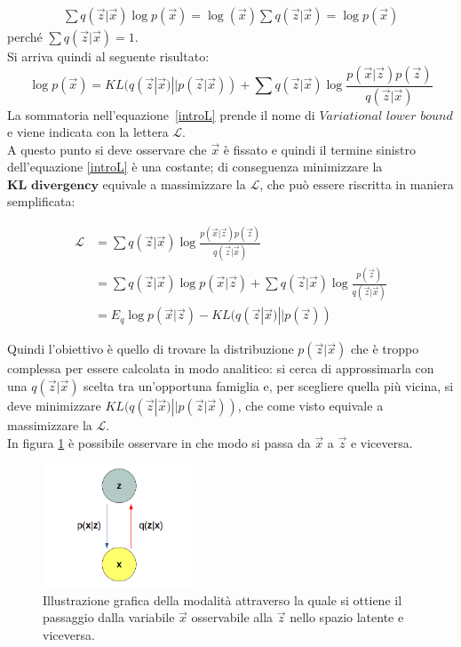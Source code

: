 \begin{align*}
	\sum q(\vec{z}|\vec{x})\log p(\vec{x}) =
	\log (\vec{x}) \sum q(\vec{z}|\vec{x}) =
	\log p(\vec{x})
\end{align*}
perché $\sum q(\vec{z}|\vec{x})=1$. \\
Si arriva quindi al seguente risultato:
\begin{equation}
	\log p(\vec{x}) = KL (q(\vec{z}|\vec{x}) || p(\vec{z}|\vec{x})) + \sum q(\vec{z}|\vec{x}) \log \frac{p(\vec{x}|\vec{z})p(\vec{z})}{q(\vec{z}|\vec{x})}
	\label{introL}
\end{equation}
La sommatoria nell'equazione~\ref{introL} prende il nome di $\textit{Variational lower bound}$ e viene indicata con la lettera $\mathcal{L}$. \\
A questo punto si deve osservare che $\vec{x}$ è fissato e quindi il termine sinistro dell'equazione \ref{introL} è una costante; di conseguenza minimizzare la $\textbf{KL divergency}$ equivale a massimizzare la $\mathcal{L}$, che può essere riscritta in maniera semplificata:

\begin{equation}
\label{eq:lower_bound}
\begin{split}
	\mathcal{L} &= \sum q(\vec{z}|\vec{x}) \log \frac{p(\vec{x}|\vec{z})p(\vec{z})}{q(\vec{z}|\vec{x})} \\
	 &=\sum q(\vec{z}|\vec{x}) \log p(\vec{x}|\vec{z}) + \sum q(\vec{z}|\vec{x}) \log \frac{p(\vec{z})}{q(\vec{z}|\vec{x})} \\
	  &= E_{q}\log p(\vec{x}|\vec{z}) - KL (q(\vec{z}|\vec{x}) || p(\vec{z}))
\end{split}
\end{equation}

Quindi l'obiettivo è quello di trovare la distribuzione $p(\vec{z}|\vec{x})$ che è troppo complessa per essere calcolata in modo analitico: si cerca di approssimarla con una $q(\vec{z}|\vec{x})$ scelta tra un'opportuna famiglia e, per scegliere quella più vicina, si deve minimizzare $KL (q(\vec{z}|\vec{x}) || p(\vec{z}|\vec{x}))$, che come visto equivale a massimizzare la $\mathcal{L}$. \\
In figura \ref{grafo} è possibile osservare in che modo si passa da $\vec{x}$ a $\vec{z}$ e viceversa.

\newpage

\begin{figure}[h!]
	\centering		\includegraphics[width=0.40\textwidth]{figs/grafoVAE.png}
	\caption{Illustrazione grafica della modalità attraverso la quale si ottiene il passaggio dalla variabile $\vec{x}$ osservabile alla $\vec{z}$ nello spazio latente e viceversa.}
	\label{grafo}
\end{figure}

